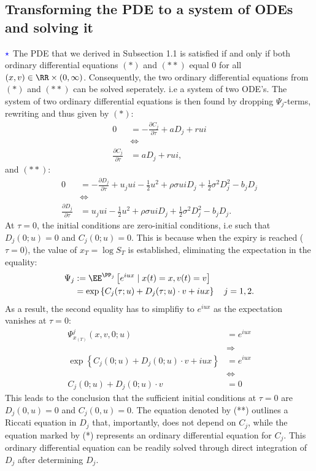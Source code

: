 \documentclass[11pt]{article}
\numberwithin{equation}{section}
\newcommand{\lc}{\left\{}
\newcommand{\rc}{\right\}}
\begin{document}
\subsection{Transforming the PDE to a system of ODEs and solving it}
$\textcolor{blue}{\star}$ The PDE that we derived in Subsection 1.1 is satisfied if and only if both
ordinary differential equations $(*)$ and $(**)$ equal $0$ for all $(x,v)\in \RR
\times (0,\infty)$. Consequently, the
two ordinary differential equations from $(*)$ and $(**)$ can be solved
seperately. i.e a system of two ODE's. The system of two ordinary differential equations is then found by dropping
$\Psi_j$-terms, rewriting and thus given by $(*)$:
\begin{align*}
    0&=-\frac{\partial C_j}{\partial \tau}+aD_j+rui\\&\iff \\ \frac{\partial C_j}{\partial \tau}&=aD_j+rui,
\end{align*}
and $(**)$:
\begin{align*}
    0&=-\frac{\partial D_j}{\partial \tau}+u_jui-\frac{1}{2}u^2+\rho\sigma u iD_j+\frac{1}{2}\sigma^2D_j^2-b_jD_j\\ &\iff \\ \frac{\partial D_j}{\partial \tau}&=u_jui-\frac{1}{2}u^2+\rho\sigma u iD_j+\frac{1}{2}\sigma^2D_j^2-b_jD_j.
\end{align*}
At $\tau=0$, the initial conditions are
zero-initial conditions, i.e such that $D_j(0;u)=0$ and $C_j(0;u) =0$. This is
because when the expiry is reached ($\tau = 0$), the value of $x_T = \log S_T$ is
established, eliminating the expectation in the equality:
\begin{align*}
    \Psi_j&:=\EE^{\PP_j} \left [ e^{iux}  \mid x(t)=x,v(t)=v \right]\\
    &=\exp \lc C_j (\tau; u) + D_j (\tau; u) \cdot v + i  u x \rc \quad j=1,2.
\end{align*}
As a result, the second equality has to simplifiy to $e^{iu x}$ as the
expectation vanishes at $\tau=0$:
\begin{align*}
    \Psi_{x_{(T)}}^j(x,v,0;u)&=e^{iux}\\
    &\Rightarrow\\
    \exp \lc C_j (0; u) + D_j (0; u) \cdot v + i  u x \rc&=e^{iux}\\
    &\iff\\
    C_j (0; u) + D_j (0; u) \cdot v &=0
\end{align*}
This leads to the conclusion that the sufficient initial conditions at $\tau=0$ are $D_j (0,u) = 0$
and $C_j (0,u) = 0$. The equation denoted by (**) outlines a Riccati equation
in $D_j$ that, importantly, does not depend on $C_j$, while the
equation marked by (*) represents an ordinary differential equation for $C_j$.
This ordinary differential equation can be readily solved through direct
integration of $D_j$ after determining $D_j$.
\end{document}
